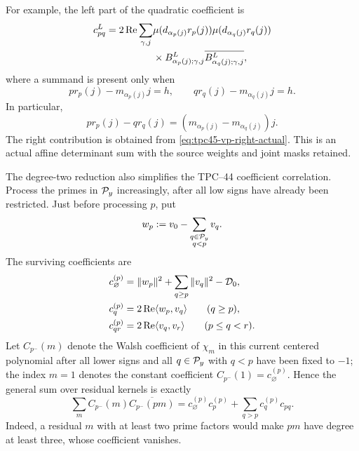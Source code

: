 For example, the left part of the quadratic coefficient is
\begin{align}
 c_{pq}^L
 =2\operatorname{Re}\sum_{\gamma,j}
 &\mu(d_{\alpha_p(j)}r_p(j))
  \mu(d_{\alpha_q(j)}r_q(j))
 \notag\\
 &\times B^L_{\alpha_p(j);\gamma,j}
  \overline{B^L_{\alpha_q(j);\gamma,j}},
 \label{eq:tpc45-cpq-actual-left}
\end{align}
where a summand is present only when
\begin{equation}
 p r_p(j)-m_{\alpha_p(j)}j=h,
 \qquad
 q r_q(j)-m_{\alpha_q(j)}j=h.
 \label{eq:tpc45-two-determinant-ladders}
\end{equation}
In particular,
\begin{equation}
 p r_p(j)-q r_q(j)
 =(m_{\alpha_p(j)}-m_{\alpha_q(j)})j.
 \label{eq:tpc45-determinant-difference}
\end{equation}
The right contribution is obtained from
\eqref{eq:tpc45-vp-right-actual}.  This is an actual affine determinant
sum with the source weights and joint masks retained.

The degree-two reduction also simplifies the TPC--44 coefficient
correlation.  Process the primes in \(\mathcal P_y\) increasingly, after all
low signs have already been restricted.  Just before processing \(p\),
put
\begin{equation}
 w_p:=v_0-\sum_{\substack{q\in\mathcal P_y\\q<p}}v_q.
 \label{eq:tpc45-wp}
\end{equation}
The surviving coefficients are
\begin{align}
 c_\varnothing^{(p)}
 &=\|w_p\|^2+\sum_{q\ge p}\|v_q\|^2-\mathcal D_0,
 \label{eq:tpc45-current-c0}\\
 c_q^{(p)}&=2\operatorname{Re}\langle w_p,v_q\rangle
 \qquad(q\ge p),
 \label{eq:tpc45-current-cq}\\
 c_{qr}^{(p)}&=2\operatorname{Re}\langle v_q,v_r\rangle
 \qquad(p\le q<r).
 \label{eq:tpc45-current-cqr}
\end{align}
Let \(C_{p^-}(m)\) denote the Walsh coefficient of \(\chi_m\) in this
current centered polynomial after all lower signs and all
\(q\in\mathcal P_y\) with \(q<p\) have been fixed to \(-1\); the index
\(m=1\) denotes the constant coefficient
\(C_{p^-}(1)=c_\varnothing^{(p)}\).
Hence the general sum over residual kernels is exactly
\begin{equation}
 \boxed{
 \sum_m C_{p^-}(m)\overline{C_{p^-}(pm)}
 =c_\varnothing^{(p)}c_p^{(p)}
  +\sum_{q>p}c_q^{(p)}c_{pq}.}
 \label{eq:tpc45-top-paired-collapse}
\end{equation}
Indeed, a residual \(m\) with at least two prime factors would make
\(pm\) have degree at least three, whose coefficient vanishes.

